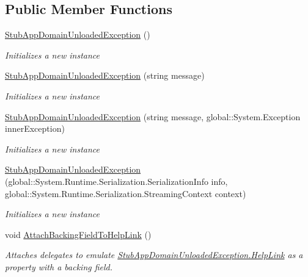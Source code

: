 \subsection*{Public Member Functions}
\begin{DoxyCompactItemize}
\item 
\hyperlink{class_system_1_1_fakes_1_1_stub_app_domain_unloaded_exception_a9e85ca311d48669af9e4e2e24811dfc1}{Stub\-App\-Domain\-Unloaded\-Exception} ()
\begin{DoxyCompactList}\small\item\em Initializes a new instance\end{DoxyCompactList}\item 
\hyperlink{class_system_1_1_fakes_1_1_stub_app_domain_unloaded_exception_ac18548dbb1c8a5b64200e775186f6e25}{Stub\-App\-Domain\-Unloaded\-Exception} (string message)
\begin{DoxyCompactList}\small\item\em Initializes a new instance\end{DoxyCompactList}\item 
\hyperlink{class_system_1_1_fakes_1_1_stub_app_domain_unloaded_exception_af721166cfb07be373e1f7fbed70424f5}{Stub\-App\-Domain\-Unloaded\-Exception} (string message, global\-::\-System.\-Exception inner\-Exception)
\begin{DoxyCompactList}\small\item\em Initializes a new instance\end{DoxyCompactList}\item 
\hyperlink{class_system_1_1_fakes_1_1_stub_app_domain_unloaded_exception_a27ff3be423aaa025adc15c2cf2e87ab1}{Stub\-App\-Domain\-Unloaded\-Exception} (global\-::\-System.\-Runtime.\-Serialization.\-Serialization\-Info info, global\-::\-System.\-Runtime.\-Serialization.\-Streaming\-Context context)
\begin{DoxyCompactList}\small\item\em Initializes a new instance\end{DoxyCompactList}\item 
void \hyperlink{class_system_1_1_fakes_1_1_stub_app_domain_unloaded_exception_ad000429bbcb4e530e566a0e7c008896a}{Attach\-Backing\-Field\-To\-Help\-Link} ()
\begin{DoxyCompactList}\small\item\em Attaches delegates to emulate \hyperlink{class_system_1_1_fakes_1_1_stub_app_domain_unloaded_exception_aad1ab4f4488f9e8c5c105fb56f35f716}{Stub\-App\-Domain\-Unloaded\-Exception.\-Help\-Link} as a property with a backing field.\end{DoxyCompactList}\item 

\end{DoxyCompactItemize}
